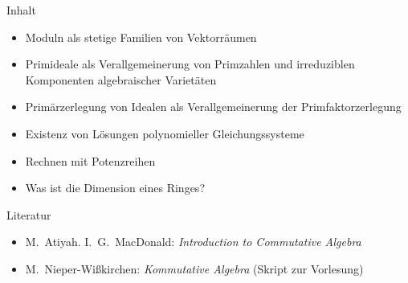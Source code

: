 \documentclass{algposter}
\begin{document}
\begin{frame}{}
\begin{columns}[t]
\begin{column}{.475\linewidth}
\begin{block}{Inhalt}
\begin{itemize}
				\item Moduln als stetige Familien von Vektorräumen
				\item Primideale als Verallgemeinerung von Primzahlen und 
				irreduziblen Komponenten algebraischer Varietäten
				\item Primärzerlegung von Idealen als Verallgemeinerung der
				Primfaktorzerlegung
				\item Existenz von Lösungen polynomieller Gleichungssysteme
				\item Rechnen mit Potenzreihen
				\item Was ist die Dimension eines Ringes?
				\end{itemize}
			\end{block}
			\begin{block}{Literatur}
				\begin{itemize}
				\item M.~Atiyah. I.~G.~MacDonald: \emph{Introduction to Commutative
					Algebra}
				\item M.~Nieper-Wißkirchen: \emph{Kommutative Algebra} (Skript zur Vorlesung)
				\end{itemize}
			\end{block}
		\end{column}
	\end{columns}
	\vfill
\end{frame}
\end{document}

